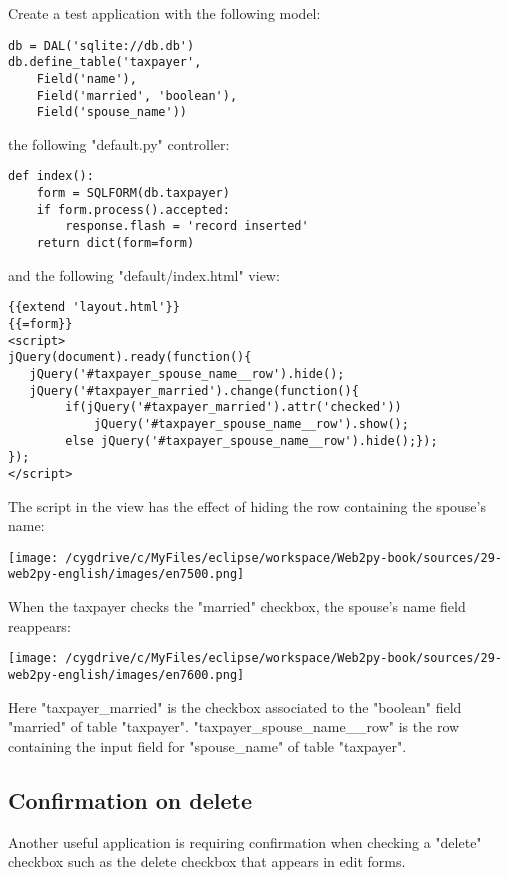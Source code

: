 \documentclass[justified,sixbynine,notoc]{tufte-book}
\def\inxx#1{\index{#1}}
\begin{document}
\begin{fullwidth}
Create a test application with the following model:
\begin{lstlisting}
db = DAL('sqlite://db.db')
db.define_table('taxpayer',
    Field('name'),
    Field('married', 'boolean'),
    Field('spouse_name'))
\end{lstlisting}
\noindent the following "default.py" controller:
\begin{lstlisting}
def index():
    form = SQLFORM(db.taxpayer)
    if form.process().accepted:
        response.flash = 'record inserted'
    return dict(form=form)
\end{lstlisting}
\noindent and the following "default/index.html" view:
\begin{lstlisting}[keywords={}]
{{extend 'layout.html'}}
{{=form}}
<script>
jQuery(document).ready(function(){
   jQuery('#taxpayer_spouse_name__row').hide();
   jQuery('#taxpayer_married').change(function(){
        if(jQuery('#taxpayer_married').attr('checked'))
            jQuery('#taxpayer_spouse_name__row').show();
        else jQuery('#taxpayer_spouse_name__row').hide();});
});
</script>
\end{lstlisting}

The script in the view has the effect of hiding the row containing the spouse's name:


\goodbreak\begin{center}\texttt{[image: /cygdrive/c/MyFiles/eclipse/workspace/Web2py-book/sources/29-web2py-english/images/en7500.png]}\end{center}


When the taxpayer checks the "married" checkbox, the spouse's name field reappears:


\goodbreak\begin{center}\texttt{[image: /cygdrive/c/MyFiles/eclipse/workspace/Web2py-book/sources/29-web2py-english/images/en7600.png]}\end{center}


Here "taxpayer\_married" is the checkbox associated to the "boolean" field "married" of table "taxpayer". "taxpayer\_spouse\_name\_\_row" is the row containing the input field for "spouse\_name" of table "taxpayer".

\goodbreak\subsection{Confirmation on delete}

\inxx{confirmation}

Another useful application is requiring confirmation when checking a "delete" checkbox such as the delete checkbox that appears in edit forms.


\end{fullwidth}
\end{document}
